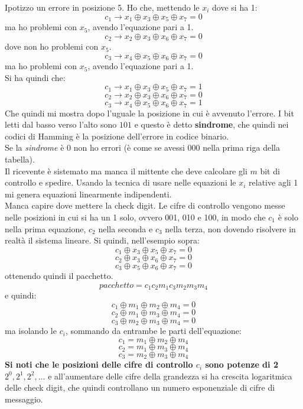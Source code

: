 \documentclass[a4paper,12pt, oneside]{book}
\begin{document}
Ipotizzo un errore in posizione 5. Ho che, mettendo le $x_i$ dove si ha 1:
\[c_1\to x_1\oplus x_3\oplus x_5 \oplus x_7=0\]
ma ho problemi con $x_5$, avendo l'equazione pari a 1.\\
\[c_2\to x_2\oplus x_3\oplus x_6 \oplus x_7=0\]
dove non ho problemi con $x_5$.\\
\[c_3\to x_4\oplus x_5\oplus x_6 \oplus x_7=0\]
ma ho problemi con $x_5$, avendo l'equazione pari a 1.\\
Si ha quindi che:
\[c_1\to x_1\oplus x_3\oplus x_5 \oplus x_7=1\]
\[c_2\to x_2\oplus x_3\oplus x_6 \oplus x_7=0\]
\[c_3\to x_4\oplus x_5\oplus x_6 \oplus x_7=1\]
Che quindi mi mostra dopo l'uguale la posizione in cui è avvenuto
l'errore. I bit letti dal basso verso l'alto sono $101$ e questo è detto
\textbf{sindrome}, che quindi nei codici di Hamming è la 
posizione dell'errore in codice binario. \\
Se la \textit{sindrome} è 0 non ho errori (è come se avessi 000 nella prima riga
della tabella).\\
Il ricevente è sistemato ma manca il mittente che deve calcolare gli $m$ bit di
controllo e spedire. Usando la tecnica di usare nelle equazioni le $x_i$
relative agli 1 mi genera equazioni linearmente indipendenti. \\
Manca capire dove
mettere la check digit. Le cifre di controllo vengono messe nelle posizioni in
cui si ha un 1 solo, ovvero 001, 010 e 100, in modo che $c_1$ è solo nella prima
equazione, $c_2$ nella seconda e $c_3$ nella terza, non dovendo risolvere in
realtà il sistema lineare. Si quindi, nell'esempio sopra:
\[c_1\oplus x_3\oplus x_5 \oplus x_7=0\]
\[c_2\oplus x_3\oplus x_6 \oplus x_7=0\]
\[c_3\oplus x_5\oplus x_6 \oplus x_7=0\]
ottenendo quindi il pacchetto.
\[pacchetto = c_1c_2m_1c_3m_2m_3m_4\]
e quindi:
\[c_1\oplus m_1\oplus m_2 \oplus m_4=0\]
\[c_2\oplus m_1\oplus m_3 \oplus m_4=0\]
\[c_3\oplus m_2\oplus m_3 \oplus m_4=0\]
ma isolando le $c_i$, sommando da entrambe le parti dell'equazione:
\[c_1= m_1\oplus m_2 \oplus m_4\]
\[c_2= m_1\oplus m_3 \oplus m_4\]
\[c_3= m_2\oplus m_3 \oplus m_4\]
\textbf{Si noti che le posizioni delle cifre di controllo $c_i$ sono potenze di
  2 $2^0,2^1,2^2,\ldots$} e all'aumentare delle cifre della grandezza si ha
crescita logaritmica delle check digit, che quindi controllano un numero
esponenziale di cifre di messaggio.\\
\end{document}
